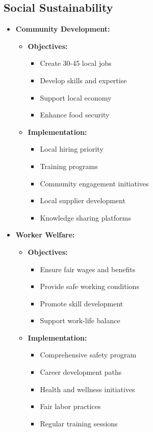\subsection{Social Sustainability}
\begin{itemize}
    \item \textbf{Community Development:}
    \begin{itemize}
        \item \textbf{Objectives:}
        \begin{itemize}
            \item Create 30-45 local jobs
            \item Develop skills and expertise
            \item Support local economy
            \item Enhance food security
        \end{itemize}
        \item \textbf{Implementation:}
        \begin{itemize}
            \item Local hiring priority
            \item Training programs
            \item Community engagement initiatives
            \item Local supplier development
            \item Knowledge sharing platforms
        \end{itemize}
    \end{itemize}
    
    \item \textbf{Worker Welfare:}
    \begin{itemize}
        \item \textbf{Objectives:}
        \begin{itemize}
            \item Ensure fair wages and benefits
            \item Provide safe working conditions
            \item Promote skill development
            \item Support work-life balance
        \end{itemize}
        \item \textbf{Implementation:}
        \begin{itemize}
            \item Comprehensive safety program
            \item Career development paths
            \item Health and wellness initiatives
            \item Fair labor practices
            \item Regular training sessions
        \end{itemize}
    \end{itemize}
    

\end{itemize}
